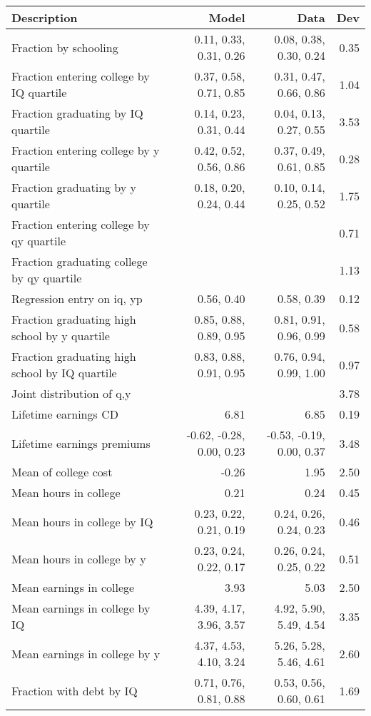 \begin{tabular}{lrrr}
\hline
Description & Model  & Data  & Dev  \\ 
\hline
Fraction by schooling & 0.11, 0.33, 0.31, 0.26  & 0.08, 0.38, 0.30, 0.24  & 0.35  \\ 
Fraction entering college by IQ quartile & 0.37, 0.58, 0.71, 0.85  & 0.31, 0.47, 0.66, 0.86  & 1.04  \\ 
Fraction graduating by IQ quartile & 0.14, 0.23, 0.31, 0.44  & 0.04, 0.13, 0.27, 0.55  & 3.53  \\ 
Fraction entering college by y quartile & 0.42, 0.52, 0.56, 0.86  & 0.37, 0.49, 0.61, 0.85  & 0.28  \\ 
Fraction graduating by y quartile & 0.18, 0.20, 0.24, 0.44  & 0.10, 0.14, 0.25, 0.52  & 1.75  \\ 
Fraction entering college by qy quartile &   &   & 0.71  \\ 
Fraction graduating college by qy quartile &   &   & 1.13  \\ 
Regression entry on iq, yp & 0.56, 0.40  & 0.58, 0.39  & 0.12  \\ 
Fraction graduating high school by y quartile & 0.85, 0.88, 0.89, 0.95  & 0.81, 0.91, 0.96, 0.99  & 0.58  \\ 
Fraction graduating high school by IQ quartile & 0.83, 0.88, 0.91, 0.95  & 0.76, 0.94, 0.99, 1.00  & 0.97  \\ 
Joint distribution of q,y &   &   & 3.78  \\ 
Lifetime earnings CD & 6.81  & 6.85  & 0.19  \\ 
Lifetime earnings premiums & -0.62, -0.28, 0.00, 0.23  & -0.53, -0.19, 0.00, 0.37  & 3.48  \\ 
Mean of college cost & -0.26  & 1.95  & 2.50  \\ 
Mean hours in college & 0.21  & 0.24  & 0.45  \\ 
Mean hours in college by IQ & 0.23, 0.22, 0.21, 0.19  & 0.24, 0.26, 0.24, 0.23  & 0.46  \\ 
Mean hours in college by y & 0.23, 0.24, 0.22, 0.17  & 0.26, 0.24, 0.25, 0.22  & 0.51  \\ 
Mean earnings in college & 3.93  & 5.03  & 2.50  \\ 
Mean earnings in college by IQ & 4.39, 4.17, 3.96, 3.57  & 4.92, 5.90, 5.49, 4.54  & 3.35  \\ 
Mean earnings in college by y & 4.37, 4.53, 4.10, 3.24  & 5.26, 5.28, 5.46, 4.61  & 2.60  \\ 
Fraction with debt by IQ & 0.71, 0.76, 0.81, 0.88  & 0.53, 0.56, 0.60, 0.61  & 1.69  \\ 

\end{tabular}

